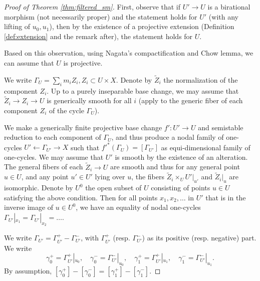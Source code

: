 \documentclass{amsart}
\theoremstyle{definition}
\theoremstyle{remark}
\begin{document}
\begin{proof}[Proof of Theorem \ref{thm:filtered_sm}]
    First, observe that if $U' \to U$ is a birational morphism (not necessarily proper) and the statement holds for $U'$ (with any lifting of $u_0, u_1$), then by the existence of a projective extension (Definition \ref{def:extension} and the remark after), the statement holds for $U$.
    
    Based on this observation, using Nagata's compactification and Chow lemma, we can assume that $U$ is projective.

    We write $\Gamma_U=\sum_i m_i Z_i, Z_i \subset U \times X$.
    Denote by $\tilde{Z}_i$ the normalization of the component $Z_i$. 
    Up to a purely inseparable base change, we may assume that $\tilde{Z}_i \to Z_i \to U$ is generically smooth for all $i$ (apply \cite[Lemma 2.8]{deJong_families_of_curves_and_alteration} to the generic fiber of each component $Z_i$ of the cycle $\Gamma_U$).
    

    We make a generically finite projective base change $f': U' \to U$ and semistable reduction \cite[Theorem 5.8]{deJong_alteration} to each component of $\Gamma_U$,  
    and thus produce a nodal family of one-cycles $U' \leftarrow {\Gamma}_{U'} \to X$ such that $f'^*(\Gamma_U)=[\Gamma_{U'}]$ as equi-dimensional family of one-cycles.
    We may assume that $U'$ is smooth by the existence of an alteration.
    The general fibers of each $\tilde{Z}_i \to U$ are smooth and thus for any general point $u \in U$, and any point $u' \in U'$ lying over $u$, the fibers $\tilde{Z}_i\times_U U'|_{u'}$ and $\tilde{Z}_i|_{u}$ are isomorphic.
    Denote by $U^0$ the open subset of $U$ consisting of points $u\in U$ satisfying the above condition.
     Then for all points $x_1, x_2, \ldots$ in $U'$ that is in the inverse image of $u \in U^0$, we have an equality of nodal one-cycles $\Gamma_{U'}|_{x_1}=\Gamma_{U'}|_{x_2}=\ldots$.
     
   We write $\Gamma_{U'}=\Gamma^+_{U'}-\Gamma^-_{U'}$, with $\Gamma^+_{U'}$ (resp. $\Gamma^-_{U'}$) as its positive (resp. negative) part. We write
    \[
\gamma_0^+=\Gamma^+_{U'}|_{u_0},\quad \gamma_0^-=\Gamma^-_{U'}|_{u_0},\quad
    \gamma_1^+=\Gamma^+_{U'}|_{u_1},\quad
    \gamma_1^-=\Gamma^-_{U'}|_{u_1}.
    \]
    By assumption, 
    $[\gamma_0^+]-[\gamma_0^-]=[\gamma_1^+]-[\gamma_1^-]$. 


\end{proof}
\end{document}
